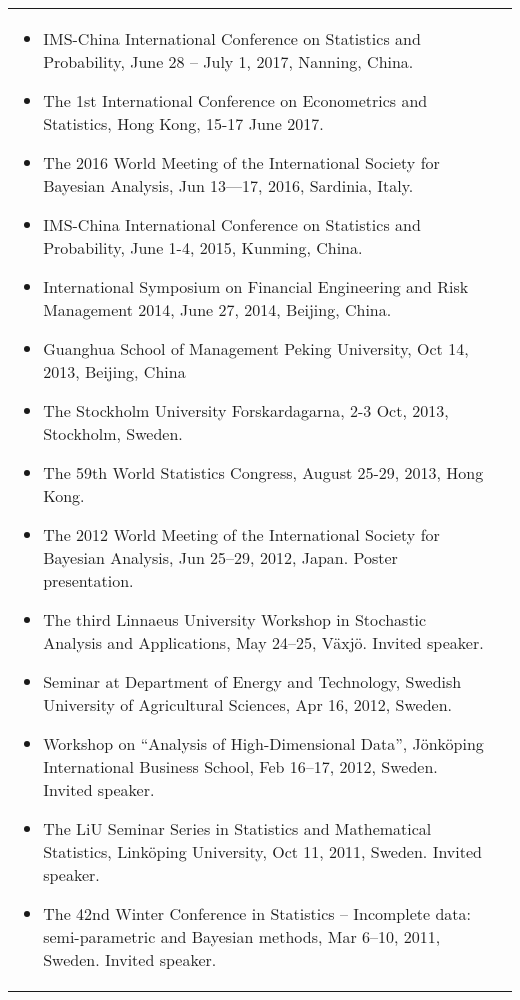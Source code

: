 \documentclass[twoside,a4paper,10.5pt]{article}
\begin{document}
\begin{tabular}{ll}
\begin{itemize}
\item IMS-China International Conference on Statistics and Probability, June 28 – July 1, 2017, Nanning, China.

\item The 1st International Conference on Econometrics and Statistics, Hong Kong, 15-17 June 2017.

\item The 2016 World Meeting of the International Society for Bayesian Analysis, Jun 13—17, 2016, Sardinia, Italy.

\item IMS-China International Conference on Statistics and Probability, June 1-4, 2015, Kunming, China.

\item International Symposium on Financial Engineering and Risk Management 2014, June 27, 2014, Beijing, China.

\item Guanghua School of Management Peking University, Oct 14, 2013, Beijing, China

\item The Stockholm University Forskardagarna, 2-3 Oct, 2013, Stockholm, Sweden.

\item The 59th World Statistics Congress, August 25-29, 2013, Hong Kong.

\item The 2012 World Meeting of the International Society for Bayesian Analysis, Jun 25--29, 2012, Japan. Poster presentation.

\item The third Linnaeus University Workshop in Stochastic Analysis and Applications, May 24--25, Växjö. Invited speaker.

\item Seminar at Department of Energy and Technology, Swedish University of Agricultural Sciences, Apr 16, 2012, Sweden.

\item Workshop on ``Analysis of High-Dimensional Data'', Jönköping International Business School, Feb 16--17, 2012, Sweden. Invited speaker.

\item The LiU Seminar Series in Statistics and Mathematical Statistics, Linköping University, Oct 11, 2011, Sweden. Invited speaker.

\item The 42nd Winter Conference in Statistics -- Incomplete data: semi-parametric and Bayesian methods, Mar 6--10, 2011, Sweden. Invited speaker.


\end{itemize}
\end{tabular}
\end{document}
